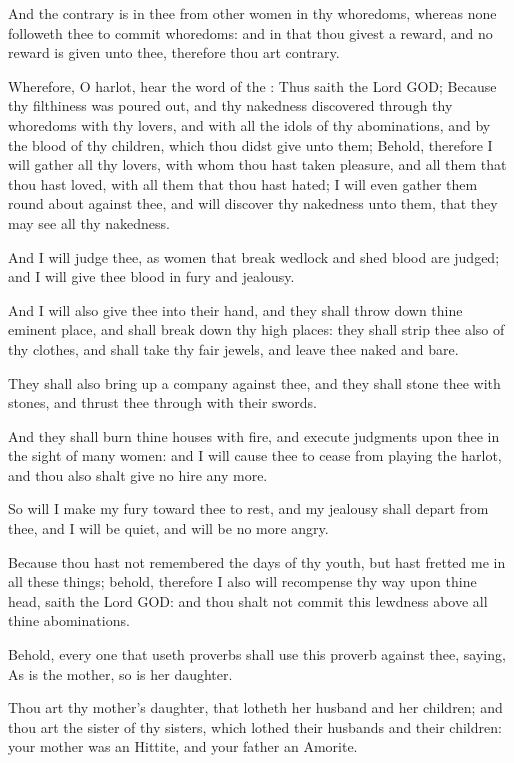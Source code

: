 \Verse And the contrary is in thee from other women in thy whoredoms, whereas none followeth thee to commit whoredoms: and in that thou givest a reward, and no reward is given unto thee, therefore thou art contrary.

\Verse Wherefore, O harlot, hear the word of the \LORD: \Verse Thus saith the Lord GOD; Because thy filthiness was poured out, and thy nakedness discovered through thy whoredoms with thy lovers, and with all the idols of thy abominations, and by the blood of thy children, which thou didst give unto them; \Verse Behold, therefore I will gather all thy lovers, with whom thou hast taken pleasure, and all them that thou hast loved, with all them that thou hast hated; I will even gather them round about against thee, and will discover thy nakedness unto them, that they may see all thy nakedness.

\Verse And I will judge thee, as women that break wedlock and shed blood are judged; and I will give thee blood in fury and jealousy.

\Verse And I will also give thee into their hand, and they shall throw down thine eminent place, and shall break down thy high places: they shall strip thee also of thy clothes, and shall take thy fair jewels, and leave thee naked and bare.

\Verse They shall also bring up a company against thee, and they shall stone thee with stones, and thrust thee through with their swords.

\Verse And they shall burn thine houses with fire, and execute judgments upon thee in the sight of many women: and I will cause thee to cease from playing the harlot, and thou also shalt give no hire any more.

\Verse So will I make my fury toward thee to rest, and my jealousy shall depart from thee, and I will be quiet, and will be no more angry.

\Verse Because thou hast not remembered the days of thy youth, but hast fretted me in all these things; behold, therefore I also will recompense thy way upon thine head, saith the Lord GOD: and thou shalt not commit this lewdness above all thine abominations.

\Verse Behold, every one that useth proverbs shall use this proverb against thee, saying, As is the mother, so is her daughter.

\Verse Thou art thy mother's daughter, that lotheth her husband and her children; and thou art the sister of thy sisters, which lothed their husbands and their children: your mother was an Hittite, and your father an Amorite.

